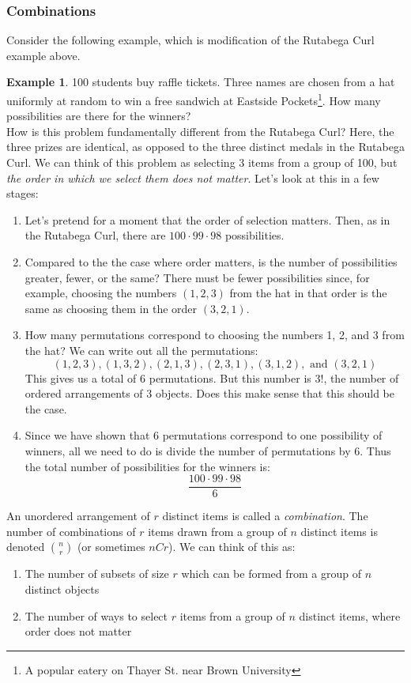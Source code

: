 \documentclass[12pt]{article}
\theoremstyle{definition}
\newtheorem*{example}{Example}
\theoremstyle{remark}
\begin{document}
\subsubsection{Combinations}
Consider the following example, which is modification of the Rutabega Curl example above.

\begin{example}100 students buy raffle tickets. Three names are chosen from a hat uniformly at random to win a free sandwich at Eastside Pockets\footnote{A popular eatery on Thayer St. near Brown University}. How many possibilities are there for the winners?\\

How is this problem fundamentally different from the Rutabega Curl? Here, the three prizes are identical, as opposed to the three distinct medals in the Rutabega Curl. We can think of this problem as selecting 3 items from a group of 100, but \emph{the order in which we select them does not matter}. Let's look at this in a few stages:
\begin{enumerate}
\item Let's pretend for a moment that the order of selection matters. Then, as in the Rutabega Curl, there are $100 \cdot 99 \cdot 98$ possibilities.
\item Compared to the the case where order matters, is the number of possibilities greater, fewer, or the same? There must be fewer possibilities since, for example, choosing the numbers $(1, 2, 3)$ from the hat in that order is the same as choosing them in the order $(3, 2, 1)$.
\item How many permutations correspond to choosing the numbers 1, 2, and 3 from the hat? We can write out all the permutations:
\[
(1, 2, 3), (1, 3, 2), (2, 1, 3), (2, 3, 1), (3, 1, 2), \text{ and } (3, 2, 1)
\]
This gives us a total of 6 permutations. But this number is $3!$, the number of ordered arrangements of 3 objects. Does this make sense that this should be the case.
\item Since we have shown that 6 permutations correspond to one possibility of winners, all we need to do is divide the number of permutations by 6. Thus the total number of possibilities for the winners is:
\[
\frac{100 \cdot 99 \cdot 98}{6}
\]
\end{enumerate}
\end{example}

\begin{framed}
An unordered arrangement of $r$ distinct items is called a \emph{combination}. The number of combinations of $r$ items drawn from a group of $n$ distinct items is denoted $\binom{n}{r}$ (or sometimes $nCr$). We can think of this as:
\begin{enumerate}
\item The number of subsets of size $r$ which can be formed from a group of $n$ distinct objects
\item The number of ways to select $r$ items from a group of $n$ distinct items, where order does not matter
\end{enumerate}
\end{framed}
\end{document}
